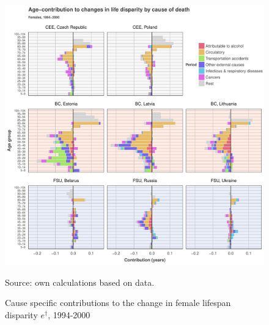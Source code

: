\documentclass{article}
\begin{document}
\newpage

\begin{figure}[h!]
\caption{Cause specific contributions to the change in  female lifespan disparity  $e^\dagger$, 1994-2000}
\centering
\begin{center}
\includegraphics[scale=.5]{Figures/Cause_ed_decomp_Females_1.pdf}
\end{center}
Source: own calculations based on \citet{HMD} data. 
\end{figure}

\newpage
\end{document}
